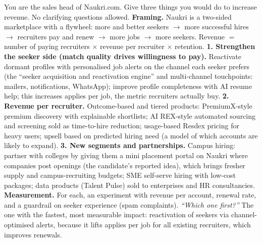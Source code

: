 \begin{qa}{ You are the sales head of Naukri.com. Give three things you would do to increase revenue. No clarifying questions allowed.}
\why
\textbf{Framing.} Naukri is a two-sided marketplace with a flywheel: more and better seekers $\to$ more successful hires $\to$ recruiters pay and renew $\to$ more jobs $\to$ more seekers.
Revenue $=$ number of paying recruiters $\times$ revenue per recruiter $\times$ retention.
\textbf{1. Strengthen the seeker side (match quality drives willingness to pay).} Reactivate dormant profiles with personalised job alerts on the channel each seeker prefers (the
``seeker acquisition and reactivation engine'' and multi-channel touchpoints: mailers, notifications, WhatsApp); improve profile completeness with AI resume help; this increases
applies per job, the metric recruiters actually buy.
\textbf{2. Revenue per recruiter.} Outcome-based and tiered products: PremiumX-style premium discovery with explainable shortlists; AI REX-style automated sourcing and screening sold as
time-to-hire reduction; usage-based Resdex pricing for heavy users; upsell based on predicted hiring need (a model of which accounts are likely to expand).
\textbf{3. New segments and partnerships.} Campus hiring: partner with colleges by giving them a mini placement portal on Naukri where companies post openings (the candidate's
reported idea), which brings fresher supply and campus-recruiting budgets; SME self-serve hiring with low-cost packages; data products (Talent Pulse) sold to enterprises and HR consultancies.
\textbf{Measurement.} For each, an experiment with revenue per account, renewal rate, and a guardrail on seeker experience (spam complaints).
\pushes \emph{``Which one first?''} The one with the fastest, most measurable impact: reactivation of seekers via channel-optimised alerts, because it lifts applies per job for all existing
recruiters, which improves renewals.
\end{qa}

